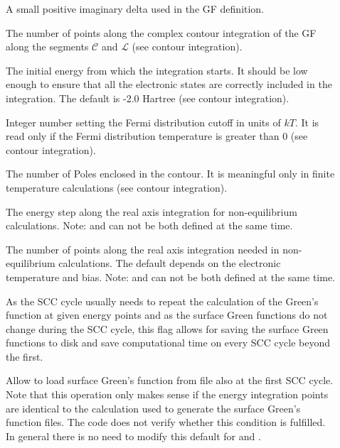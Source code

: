\begin{description}
\item[] A small
  positive imaginary delta used in the GF definition.
  \item[] The number of points along the complex contour
    integration of the GF along the segments $\mathcal{C}$ and $\mathcal{L}$
    (see contour integration).
\item[] The
  initial energy from which the integration starts. It should be low enough to
  ensure that all the electronic states are correctly included in the
  integration. The default is -2.0 Hartree (see contour integration).
\item[] Integer number setting the Fermi distribution cutoff in
  units of $kT$. It is read only if the Fermi distribution temperature is
  greater than 0 (see contour integration).
\item[] The number of Poles enclosed in the contour. It is
  meaningful only in finite temperature calculations (see contour integration).
\item[] The energy step along the real
  axis integration for non-equilibrium calculations. Note:  and
   can not be both defined at the same time.

\item[] The number of points along the real axis integration
  needed in non-equilibrium calculations. The default depends on the electronic
  temperature and bias. Note:  and  can not
  be both defined at the same time.

\item[] As the SCC cycle usually needs to repeat the
  calculation of the Green's function at given energy points and as the surface
  Green functions do not change during the SCC cycle, this flag allows for
  saving the surface Green functions to disk and save computational time on
  every SCC cycle beyond the first.

\item[] Allow to load surface Green's function from file also
  at the first SCC cycle. Note that this operation only makes sense if the
  energy integration points are identical to the calculation used to generate
  the surface Green's function files. The code does not verify whether this
  condition is fulfilled. In general there is no need to modify this default for
   and .


\end{description}
